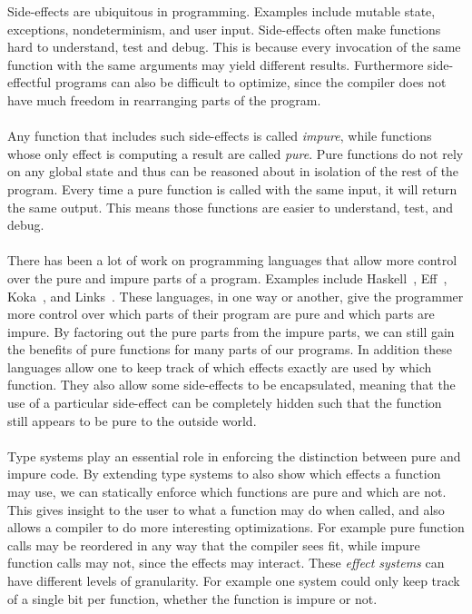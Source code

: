 Side-effects are ubiquitous in programming.
Examples include mutable state, exceptions, nondeterminism, and user input.
Side-effects often make functions hard to understand, test and debug.
This is because every invocation of the same function with the same arguments may yield different results.
Furthermore side-effectful programs can also be difficult to optimize, since the compiler does not have much freedom in rearranging parts of the program.
\\\\
Any function that includes such side-effects is called \emph{impure}, while functions whose only effect is computing a result are called \emph{pure}.
Pure functions do not rely on any global state and thus can be reasoned about in isolation of the rest of the program.
Every time a pure function is called with the same input, it will return the same output.
This means those functions are easier to understand, test, and debug.
\\\\
There has been a lot of work on programming languages that allow more control over the pure and impure parts of a program.
Examples include Haskell~\autocite{haskell}, Eff~\autocite{eff1}, Koka~\autocite{koka2}, and Links~\autocite{links}.
These languages, in one way or another, give the programmer more control over which parts of their program are pure and which parts are impure.
By factoring out the pure parts from the impure parts, we can still gain the benefits of pure functions for many parts of our programs.
In addition these languages allow one to keep track of which effects exactly are used by which function.
They also allow some side-effects to be encapsulated, meaning that the use of a particular side-effect can be completely hidden such that the function still appears to be pure to the outside world.
\\\\
Type systems play an essential role in enforcing the distinction between pure and impure code.
By extending type systems to also show which effects a function may use, we can statically enforce which functions are pure and which are not.
This gives insight to the user to what a function may do when called, and also allows a compiler to do more interesting optimizations.
For example pure function calls may be reordered in any way that the compiler sees fit, while impure function calls may not, since the effects may interact.
These \emph{effect systems} can have different levels of granularity.
For example one system could only keep track of a single bit per function, whether the function is impure or not.
